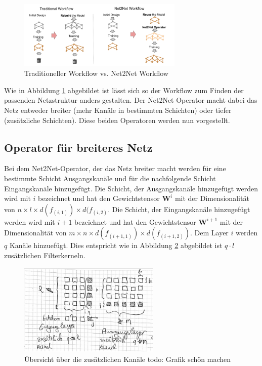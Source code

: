 \begin{figure}[h]
 \centering
 \includegraphics[width=0.7\textwidth]{KapitelPartA/images/net2net.png}
 \caption{Traditioneller Workflow vs. Net2Net Workflow}
 \label{abb:net2net}
\end{figure}


Wie in Abbildung \ref{abb:net2net} abgebildet ist lässt sich so der Workflow zum Finden der passenden Netzstruktur anders gestalten. Der Net2Net Operator macht dabei das Netz entweder breiter (mehr Kanäle in bestimmten Schichten) oder tiefer (zusätzliche Schichten). Diese beiden Operatoren werden nun vorgestellt.

\subsection{Operator für breiteres Netz}
Bei dem Net2Net-Operator, der das Netz breiter macht werden für eine bestimmte Schicht Ausgangskanäle und für die nachfolgende Schicht Eingangskanäle hinzugefügt. Die Schicht, der Ausgangskanäle hinzugefügt werden wird mit $i$ bezeichnet und hat den Gewichtstensor $\mathbf{W}^i$ mit der Dimensionalität von $n \times l \times d(f_{(i,1)}) \times d(f_{(i,2)}$. Die Schicht, der Eingangskanäle hinzugefügt werden wird mit $i+1$ bezeichnet und hat den Gewichtstensor $\mathbf{W}^{i+1}$ mit der Dimensionalität von $m \times n \times d(f_{(i+1,1)}) \times d(f_{(i+1,2)})$. Dem Layer $i$ werden $q$ Kanäle hinzuefügt. Dies entspricht wie in Abbildung \ref{abb:channels} abgebildet ist $q \cdot l $ zusätzlichen Filterkerneln. 

\begin{figure}[h]
 \centering
 \includegraphics[width=0.6\textwidth]{KapitelPartA/images/channels.png}
 \caption{Übersicht über die zusätzlichen Kanäle todo: Grafik schön machen}
\label{abb:channels}
 \end{figure}



